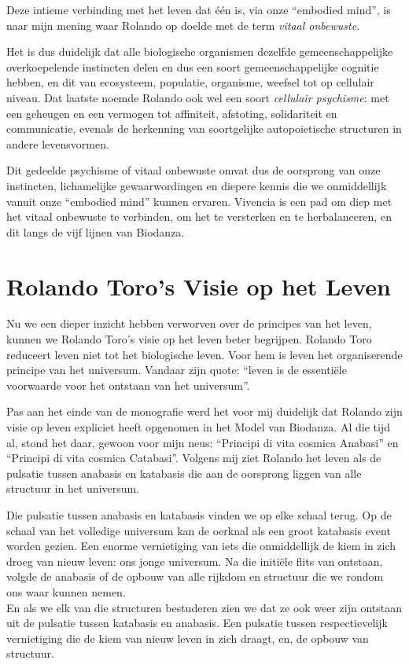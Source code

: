 \documentclass[
  11pt,
]{book}
\begin{document}
Deze intieme verbinding met het leven dat één is, via onze ``embodied mind'', is naar mijn mening waar Rolando op doelde met de term \emph{vitaal onbewuste}.

Het is dus duidelijk dat alle biologische organismen dezelfde gemeenschappelijke overkoepelende instincten delen en dus een soort gemeenschappelijke cognitie hebben, en dit van ecosysteem, populatie, organisme, weefsel tot op cellulair niveau. Dat laatste noemde Rolando ook wel een soort \emph{cellulair psychisme}: met een geheugen en een vermogen tot affiniteit, afstoting, solidariteit en communicatie, evenals de herkenning van soortgelijke autopoietische structuren in andere levensvormen.

Dit gedeelde psychisme of vitaal onbewuste omvat dus de oorsprong van onze instincten, lichamelijke gewaarwordingen en diepere kennis die we onmiddellijk vanuit onze ``embodied mind'' kunnen ervaren. Vivencia is een pad om diep met het vitaal onbewuste te verbinden, om het te versterken en te herbalanceren, en dit langs de vijf lijnen van Biodanza.

\hypertarget{rolando-toros-visie-op-het-leven}{%
\section{Rolando Toro's Visie op het Leven}\label{rolando-toros-visie-op-het-leven}}

Nu we een dieper inzicht hebben verworven over de principes van het leven, kunnen we Rolando Toro's visie op het leven beter begrijpen.
Rolando Toro reduceert leven niet tot het biologische leven.
Voor hem is leven het organiserende principe van het universum.
Vandaar zijn quote: ``leven is de essentiële voorwaarde voor het ontstaan van het universum''.

Pas aan het einde van de monografie werd het voor mij duidelijk dat Rolando zijn visie op leven expliciet heeft opgenomen in het Model van Biodanza. Al die tijd al, stond het daar, gewoon voor mijn neus: ``Principi di vita cosmica Anabasi'' en ``Principi di vita cosmica Catabasi''.
Volgens mij ziet Rolando het leven als de pulsatie tussen anabasis en katabasis die aan de oorsprong liggen van alle structuur in het universum.

Die pulsatie tussen anabasis en katabasis vinden we op elke schaal terug.
Op de schaal van het volledige universum kan de oerknal als een groot katabasis event worden gezien. Een enorme vernietiging van iets die onmiddellijk de kiem in zich droeg van nieuw leven: ons jonge universum. Na die initiële flits van ontstaan, volgde de anabasis of de opbouw van alle rijkdom en structuur die we rondom ons waar kunnen nemen.\\
En als we elk van die structuren bestuderen zien we dat ze ook weer zijn ontstaan uit de pulsatie tussen katabasis en anabasis.
Een pulsatie tussen respectievelijk vernietiging die de kiem van nieuw leven in zich draagt, en, de opbouw van structuur.
\end{document}
